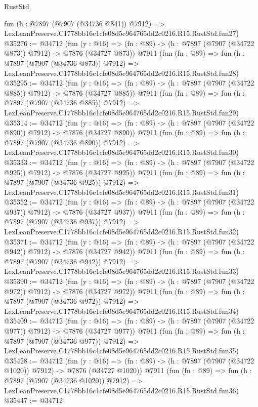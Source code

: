 \begin{lexlean}{RustStd}
\begin{coremodule}
    fun (h : @7897 (@7907 (@34736 @841)) @7912) =>
    LexLeanPreserve.C1778bb16c1cfe08d5e964765dd2c0216.R15.RustStd.fun27)
@35276 := @34712
    (fun (y : @16) => (fn : @89) -> (h : @7897 (@7907 (@34722 @873)) @7912) -> @7876 (@34727 @873))
    @7911
    (fun (fn : @89) =>
    fun (h : @7897 (@7907 (@34736 @873)) @7912) =>
    LexLeanPreserve.C1778bb16c1cfe08d5e964765dd2c0216.R15.RustStd.fun28)
@35295 := @34712
    (fun (y : @16) => (fn : @89) -> (h : @7897 (@7907 (@34722 @885)) @7912) -> @7876 (@34727 @885))
    @7911
    (fun (fn : @89) =>
    fun (h : @7897 (@7907 (@34736 @885)) @7912) =>
    LexLeanPreserve.C1778bb16c1cfe08d5e964765dd2c0216.R15.RustStd.fun29)
@35314 := @34712
    (fun (y : @16) => (fn : @89) -> (h : @7897 (@7907 (@34722 @890)) @7912) -> @7876 (@34727 @890))
    @7911
    (fun (fn : @89) =>
    fun (h : @7897 (@7907 (@34736 @890)) @7912) =>
    LexLeanPreserve.C1778bb16c1cfe08d5e964765dd2c0216.R15.RustStd.fun30)
@35333 := @34712
    (fun (y : @16) => (fn : @89) -> (h : @7897 (@7907 (@34722 @925)) @7912) -> @7876 (@34727 @925))
    @7911
    (fun (fn : @89) =>
    fun (h : @7897 (@7907 (@34736 @925)) @7912) =>
    LexLeanPreserve.C1778bb16c1cfe08d5e964765dd2c0216.R15.RustStd.fun31)
@35352 := @34712
    (fun (y : @16) => (fn : @89) -> (h : @7897 (@7907 (@34722 @937)) @7912) -> @7876 (@34727 @937))
    @7911
    (fun (fn : @89) =>
    fun (h : @7897 (@7907 (@34736 @937)) @7912) =>
    LexLeanPreserve.C1778bb16c1cfe08d5e964765dd2c0216.R15.RustStd.fun32)
@35371 := @34712
    (fun (y : @16) => (fn : @89) -> (h : @7897 (@7907 (@34722 @942)) @7912) -> @7876 (@34727 @942))
    @7911
    (fun (fn : @89) =>
    fun (h : @7897 (@7907 (@34736 @942)) @7912) =>
    LexLeanPreserve.C1778bb16c1cfe08d5e964765dd2c0216.R15.RustStd.fun33)
@35390 := @34712
    (fun (y : @16) => (fn : @89) -> (h : @7897 (@7907 (@34722 @972)) @7912) -> @7876 (@34727 @972))
    @7911
    (fun (fn : @89) =>
    fun (h : @7897 (@7907 (@34736 @972)) @7912) =>
    LexLeanPreserve.C1778bb16c1cfe08d5e964765dd2c0216.R15.RustStd.fun34)
@35409 := @34712
    (fun (y : @16) => (fn : @89) -> (h : @7897 (@7907 (@34722 @977)) @7912) -> @7876 (@34727 @977))
    @7911
    (fun (fn : @89) =>
    fun (h : @7897 (@7907 (@34736 @977)) @7912) =>
    LexLeanPreserve.C1778bb16c1cfe08d5e964765dd2c0216.R15.RustStd.fun35)
@35428 := @34712
    (fun (y : @16) =>
    (fn : @89) -> (h : @7897 (@7907 (@34722 @1020)) @7912) -> @7876 (@34727 @1020))
    @7911
    (fun (fn : @89) =>
    fun (h : @7897 (@7907 (@34736 @1020)) @7912) =>
    LexLeanPreserve.C1778bb16c1cfe08d5e964765dd2c0216.R15.RustStd.fun36)
@35447 := @34712

\end{coremodule}
\end{lexlean}
